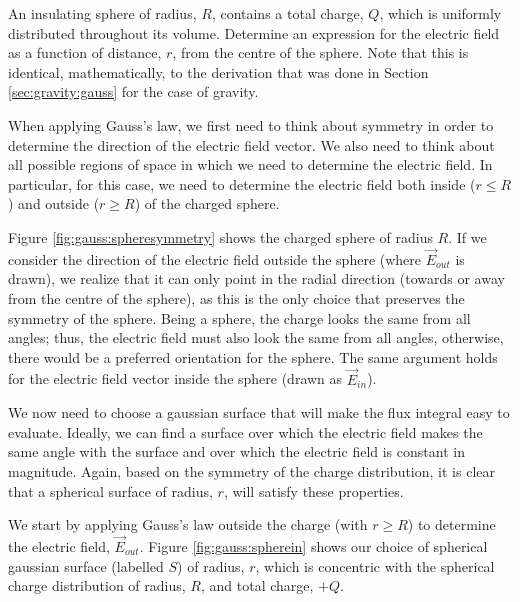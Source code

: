 \begin{example}{An insulating sphere of radius, $R$, contains a total charge, $Q$, which is uniformly distributed throughout its volume. Determine an expression for the electric field as a function of distance, $r$, from the centre of the sphere.\label{ex:gauss:spherical}}
Note that this is identical, mathematically, to the derivation that was done in Section \ref{sec:gravity:gauss} for the case of gravity. 

When applying Gauss's law,  we first need to think about symmetry in order to determine the direction of the electric field vector. We also need to think about all possible regions of space in which we need to determine the electric field. In particular, for this case, we need to determine the electric field both inside ($r\leq R$) and outside ($r\geq R$) of the charged sphere.

Figure \ref{fig:gauss:spheresymmetry} shows the charged sphere of radius $R$. If we consider the direction of the electric field outside the sphere (where $\vec E_{out}$ is drawn), we realize that it can only point in the radial direction (towards or away from the centre of the sphere), as this is the only choice that preserves the symmetry of the sphere. Being a sphere, the charge looks the same from all angles; thus, the electric field must also look the same from all angles, otherwise, there would be a preferred orientation for the sphere. The same argument holds for the electric field vector inside the sphere (drawn as $\vec E_{in}$). 

We now need to choose a gaussian surface that will make the flux integral easy to evaluate. Ideally, we can find a surface over which the electric field makes the same angle with the surface and over which the electric field is constant in magnitude. Again, based on the symmetry of the charge distribution, it is clear that a spherical surface of radius, $r$, will satisfy these properties.

We start by applying Gauss's law outside the charge (with $r\geq R$) to determine the electric field, $\vec E_{out}$. Figure \ref{fig:gauss:spherein} shows our choice of spherical gaussian surface (labelled $S$) of radius, $r$, which is concentric with the spherical charge distribution of radius, $R$, and total charge, $+Q$.


\end{example}

